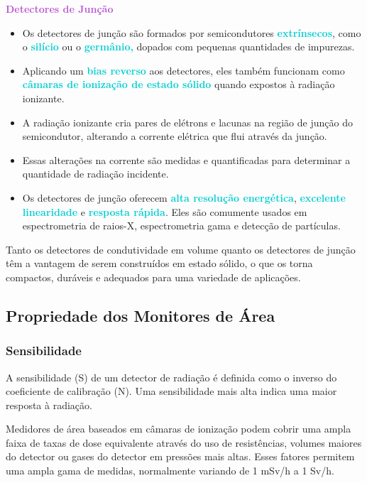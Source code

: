\documentclass[11pt,a4paper]{article}
\begin{document}
	\textcolor{MediumOrchid}{\Large\LobsterTwo\textbf{Detectores de Junção}}
	\begin{itemize}
		\item Os detectores de junção são formados por semicondutores \textcolor{DarkTurquoise}{\textbf{extrínsecos}}, como o \textcolor{DarkTurquoise}{\textbf{silício}} ou o \textcolor{DarkTurquoise}{\textbf{germânio,}} dopados com pequenas quantidades de impurezas.
		\item Aplicando um \textcolor{DarkTurquoise}{\textbf{bias reverso}} aos detectores, eles também funcionam como \textcolor{DarkTurquoise}{\textbf{câmaras de ionização de estado sólido}} quando expostos à radiação ionizante.
		\item A radiação ionizante cria pares de elétrons e lacunas na região de junção do semicondutor, alterando a corrente elétrica que flui através da junção.
		\item Essas alterações na corrente são medidas e quantificadas para determinar a quantidade de radiação incidente.
		\item Os detectores de junção oferecem \textcolor{DarkTurquoise}{\textbf{alta resolução energética}}, \textcolor{DarkTurquoise}{\textbf{excelente linearidade}} e \textcolor{DarkTurquoise}{\textbf{resposta rápida}}. Eles são comumente usados em espectrometria de raios-X, espectrometria gama e detecção de partículas.
	\end{itemize}

	Tanto os detectores de condutividade em volume quanto os detectores de junção têm a vantagem de serem construídos em estado sólido, o que os torna compactos, duráveis e adequados para uma variedade de aplicações.

\subsection*{Propriedade dos Monitores de Área}

\subsubsection*{Sensibilidade}

	A sensibilidade (S) de um detector de radiação é definida como o inverso do coeficiente de calibração (N). Uma sensibilidade mais alta indica uma maior resposta à radiação.

	Medidores de área baseados em câmaras de ionização podem cobrir uma ampla faixa de taxas de dose equivalente através do uso de resistências, volumes maiores do detector ou gases do detector em pressões mais altas. Esses fatores permitem uma ampla gama de medidas, normalmente variando de 1 mSv/h a 1 Sv/h.
\end{document}
